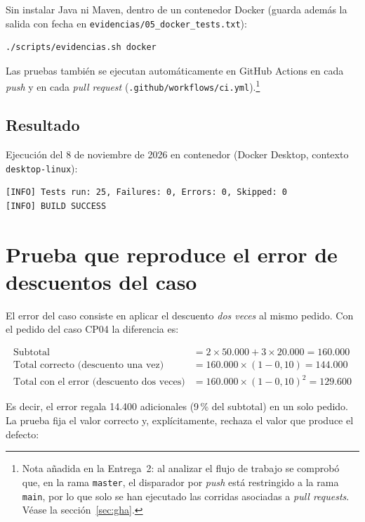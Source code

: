 \documentclass[11pt,a4paper]{article}
\begin{document}
Sin instalar Java ni Maven, dentro de un contenedor Docker (guarda además la salida con fecha en
\texttt{evidencias/05\_docker\_tests.txt}):

\begin{lstlisting}[language=shell]
./scripts/evidencias.sh docker
\end{lstlisting}

Las pruebas también se ejecutan automáticamente en GitHub Actions en cada \emph{push} y en cada
\emph{pull request} (\texttt{.github/workflows/ci.yml}).\footnote{Nota añadida en la Entrega~2: al
analizar el flujo de trabajo se comprobó que, en la rama \texttt{master}, el disparador por
\emph{push} está restringido a la rama \texttt{main}, por lo que solo se han ejecutado las
corridas asociadas a \emph{pull requests}. Véase la sección~\ref{sec:gha}.}

\subsection{Resultado}

Ejecución del 8 de noviembre de 2026 en contenedor (Docker Desktop, contexto \texttt{desktop-linux}):

\begin{lstlisting}
[INFO] Tests run: 25, Failures: 0, Errors: 0, Skipped: 0
[INFO] BUILD SUCCESS
\end{lstlisting}

\section{Prueba que reproduce el error de descuentos del caso}
\label{sec:cp04}

El error del caso consiste en aplicar el descuento \emph{dos veces} al mismo pedido. Con el pedido
del caso CP04 la diferencia es:

\begin{align*}
\text{Subtotal} &= 2 \times 50.000 + 3 \times 20.000 = 160.000\\
\text{Total correcto (descuento una vez)} &= 160.000 \times (1 - 0{,}10) = 144.000\\
\text{Total con el error (descuento dos veces)} &= 160.000 \times (1 - 0{,}10)^2 = 129.600
\end{align*}

Es decir, el error regala 14.400 adicionales (9\,\% del subtotal) en un solo pedido. La prueba fija
el valor correcto y, explícitamente, rechaza el valor que produce el defecto:
\end{document}
